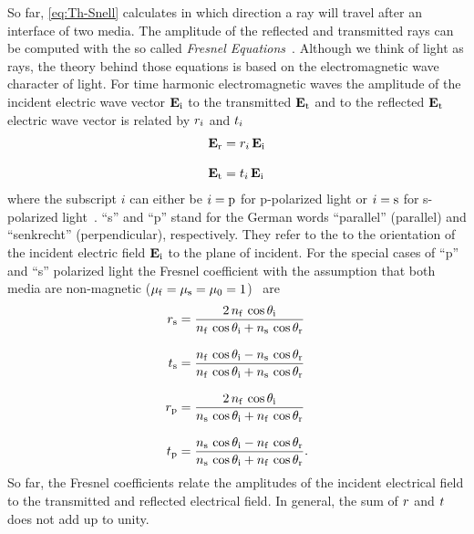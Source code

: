 
So far, \cref{eq:Th-Snell} calculates in which direction a ray will travel 
after an interface of two media. The amplitude of the reflected and transmitted 
rays can be computed with the so called \emph{Fresnel 
Equations}~\cite{Jackson2013,Born1980Ch1}. Although we think of light as rays, 
the theory behind those equations is based on the electromagnetic wave 
character of light. For time harmonic electromagnetic waves the amplitude of 
the incident electric wave vector $\vb{E}_{\mathrm{i}}$ to the transmitted 
$\vb{E}_{\mathrm{t}}$ and to the reflected $\vb{E}_{\mathrm{t}}$ electric wave vector 
is related by $r_{i}$ and $t_{i}$
\begin{subequations}
\begin{align}
  \vb{E}_{\mathrm{r}} & =r_{i}\,\vb{E}_{\mathrm{i}} \\[3mm]
  \vb{E}_{\mathrm{t}} & =t_{i}\,\vb{E}_{\mathrm{i}}
\end{align}
\end{subequations}
where the subscript $i$ can either be $i=\mathrm{p}$ for p-polarized light or 
$i=\mathrm{s}$ for s-polarized light~\cite{Jackson2013,Born1980Ch1}. ``s'' and 
``p'' stand for the German words ``parallel'' (parallel) and ``senkrecht'' 
(perpendicular), respectively. They refer to the to the orientation of the 
incident electric field $\vb{E}_{\mathrm{i}}$ to the plane of incident. For the 
special cases of ``p'' and ``s'' polarized light the Fresnel coefficient with 
the assumption that both media are non-magnetic ($\mu_{\mathrm{f}} = \mu_{\mathrm{s}} = 
\mu_{0} = 1$)~\cite{Born1980Ch1} are
\begin{subequations}
\begin{align}
  r_{\mathrm{s}} & =
  \frac{2\,n_{\mathrm{f}}\,\cos\theta_{\mathrm{i}}}{n_{\mathrm{f}}\,\cos\theta_{\mathrm{i}} + n_{\mathrm{s}}\,\cos\theta_{\mathrm{r}}} 
  \label{eq:Th-fresnel-rs}\\[3mm]
  t_{\mathrm{s}} & = \frac{n_{\mathrm{f}}\,\cos\theta_{\mathrm{i}} - 
  n_{\mathrm{s}}\,\cos\theta_{\mathrm{r}}}{n_{\mathrm{f}}\,\cos\theta_{\mathrm{i}} + n_{\mathrm{s}}\,\cos\theta_{\mathrm{r}}} 
  \label{eq:Th-fresnel-ts}\\[3mm]
  r_{\mathrm{p}} & =
  \frac{2\,n_{\mathrm{f}}\,\cos\theta_{\mathrm{i}}}{n_{\mathrm{s}}\,\cos\theta_{\mathrm{i}} + n_{\mathrm{f}}\,\cos\theta_{\mathrm{r}}} 
  \label{eq:Th-fresnel-rp}\\[3mm]
  t_{\mathrm{p}} & = \frac{n_{\mathrm{s}}\,\cos\theta_{\mathrm{i}} - 
  n_{\mathrm{f}}\,\cos\theta_{\mathrm{r}}}{n_{\mathrm{s}}\,\cos\theta_{\mathrm{i}} + n_{\mathrm{f}}\,\cos\theta_{\mathrm{r}}}.
\label{eq:Th-fresnel-tp}
\end{align}
\end{subequations}
So far, the Fresnel coefficients relate the amplitudes of the incident 
electrical field to the transmitted and reflected electrical field. In general, 
the sum of $r$ and $t$ does not add up to unity.

